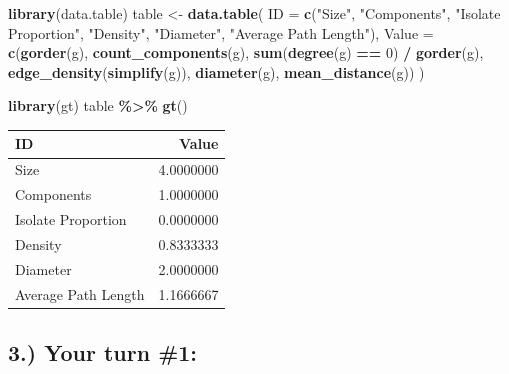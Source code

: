 \documentclass[
]{article}
\newenvironment{Shaded}{\begin{snugshade}}{\end{snugshade}}
\newcommand{\AttributeTok}[1]{\textcolor[rgb]{0.13,0.29,0.53}{#1}}
\newcommand{\DecValTok}[1]{\textcolor[rgb]{0.00,0.00,0.81}{#1}}
\newcommand{\FunctionTok}[1]{\textcolor[rgb]{0.13,0.29,0.53}{\textbf{#1}}}
\newcommand{\NormalTok}[1]{#1}
\newcommand{\OtherTok}[1]{\textcolor[rgb]{0.56,0.35,0.01}{#1}}
\newcommand{\SpecialCharTok}[1]{\textcolor[rgb]{0.81,0.36,0.00}{\textbf{#1}}}
\newcommand{\StringTok}[1]{\textcolor[rgb]{0.31,0.60,0.02}{#1}}
\begin{document}
\begin{Shaded}
\begin{Highlighting}[]
\FunctionTok{library}\NormalTok{(data.table)}
\NormalTok{table }\OtherTok{\textless{}{-}} \FunctionTok{data.table}\NormalTok{(}
  \AttributeTok{ID =} \FunctionTok{c}\NormalTok{(}\StringTok{"Size"}\NormalTok{, }\StringTok{"Components"}\NormalTok{, }\StringTok{"Isolate Proportion"}\NormalTok{, }\StringTok{"Density"}\NormalTok{, }\StringTok{"Diameter"}\NormalTok{, }\StringTok{"Average Path Length"}\NormalTok{),}
  \AttributeTok{Value =} \FunctionTok{c}\NormalTok{(}\FunctionTok{gorder}\NormalTok{(g), }\FunctionTok{count\_components}\NormalTok{(g), }\FunctionTok{sum}\NormalTok{(}\FunctionTok{degree}\NormalTok{(g) }\SpecialCharTok{==} \DecValTok{0}\NormalTok{) }\SpecialCharTok{/} \FunctionTok{gorder}\NormalTok{(g), }\FunctionTok{edge\_density}\NormalTok{(}\FunctionTok{simplify}\NormalTok{(g)), }\FunctionTok{diameter}\NormalTok{(g), }\FunctionTok{mean\_distance}\NormalTok{(g))}
\NormalTok{)}
\end{Highlighting}
\end{Shaded}

\begin{Shaded}
\begin{Highlighting}[]
\FunctionTok{library}\NormalTok{(gt)}
\NormalTok{table }\SpecialCharTok{\%\textgreater{}\%} \FunctionTok{gt}\NormalTok{()}
\end{Highlighting}
\end{Shaded}

\begin{table}[t]
\fontsize{12.0pt}{14.0pt}\selectfont
\begin{tabular*}{\linewidth}{@{\extracolsep{\fill}}lr}
\toprule
ID & Value \\ 
\midrule\addlinespace[2.5pt]
Size & 4.0000000 \\ 
Components & 1.0000000 \\ 
Isolate Proportion & 0.0000000 \\ 
Density & 0.8333333 \\ 
Diameter & 2.0000000 \\ 
Average Path Length & 1.1666667 \\ 
\bottomrule
\end{tabular*}
\end{table}

\subsection{3.) Your turn \#1:}\label{your-turn-1}
\end{document}
